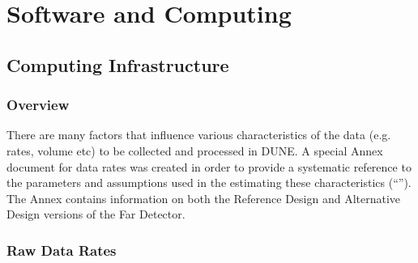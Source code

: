 \chapter{Software and Computing}
\label{ch:detectors-sc}

\section{Computing Infrastructure}
\label{sec:detectors-sc-infrastructure}

\subsection{Overview}
There are many factors that influence various characteristics of the data (e.g. rates, volume etc)
to be collected and processed in DUNE.
A special Annex document for data rates was created in order to provide a systematic reference
to the parameters and assumptions used in the estimating these characteristics (``\anxrates'').
The Annex contains information on both the Reference Design and Alternative Design
versions of the Far Detector.

\subsection{Raw Data Rates}
\label{sec:detectors-sc-infrastructure-data-rates}


